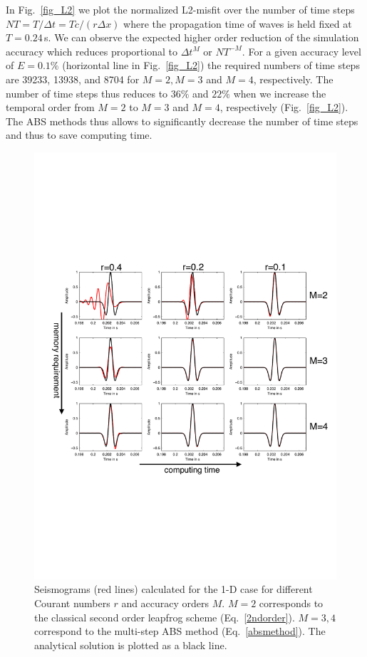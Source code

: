 In Fig.~\ref{fig_L2} we plot the normalized L2-misfit over the number of time steps $NT=T/\Delta t=T c/(r \Delta x)$ where the propagation time of waves is held fixed at $T=0.24$\,s. We can observe the expected higher order reduction of the simulation accuracy which reduces proportional to $\Delta t^{M}$ or $NT^{-M}$. For a given accuracy level of $E=0.1\%$ (horizontal line in Fig.~\ref{fig_L2}) the required numbers of time steps are 39233, 13938, and 8704 for $M=2,M=3$ and $M=4$, respectively. The number of time steps thus reduces  to $36\%$  and $22\%$  when we increase the temporal order from $M=2$ to $M=3$ and $M=4$, respectively (Fig.~\ref{fig_L2}). The ABS methods thus allows to significantly decrease the number of time steps and thus to save computing time. 
\begin{figure}[h!]
\centering
    \includegraphics[width=\textwidth]{figures/seismo.pdf}
    \caption{Seismograms (red lines) calculated for the 1-D case for different Courant numbers $r$ and accuracy orders $M$. $M=2$ corresponds to the classical second order leapfrog scheme (Eq.~\ref{2ndorder}). $M=3,4$ correspond to the multi-step ABS method (Eq.~\ref{absmethod}). The analytical solution is plotted as a black line.}
    \label{fig_1dfdseis}
\end{figure}

